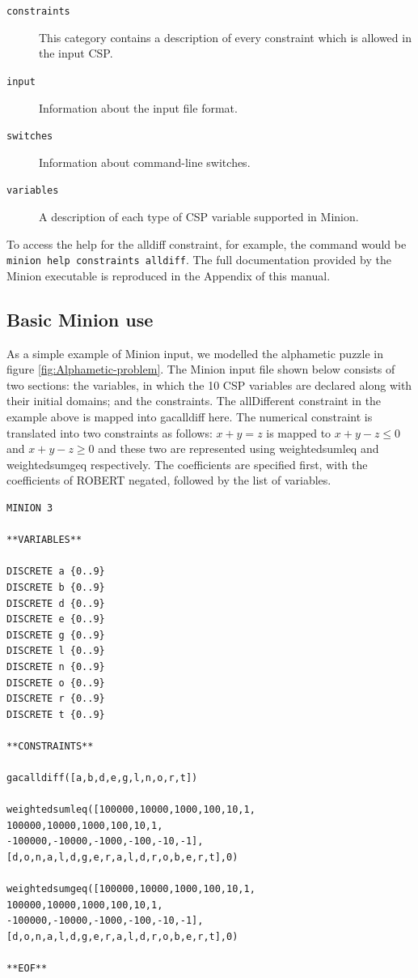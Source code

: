 \documentclass[oneside]{book}
\begin{document}
\begin{description}
\item [{\texttt{constraints}}] This category contains a description of
every constraint which is allowed in the input CSP.
\item [{\texttt{input}}] Information about the input file format.
\item [{\texttt{switches}}] Information about command-line switches.
\item [{\texttt{variables}}] A description of each type of CSP variable
supported in Minion.
\end{description}
To access the help for the alldiff constraint, for example, the command
would be \texttt{minion help constraints alldiff}. The full documentation
provided by the Minion executable is reproduced in the Appendix of 
this manual.


\subsection{Basic Minion use}

As a simple example of Minion input, we modelled the alphametic puzzle
in figure \ref{fig:Alphametic-problem}. The Minion input file shown
below consists of two sections: the variables, in which the 10 CSP
variables are declared along with their initial domains; and the constraints.
The allDifferent constraint in the example above is mapped into gacalldiff
here. The numerical constraint is translated into two constraints
as follows: $x+y=z$ is mapped to $x+y-z\le0$ and $x+y-z\ge0$ and
these two are represented using weightedsumleq and weightedsumgeq
respectively. The coefficients are specified first, with the coefficients
of ROBERT negated, followed by the list of variables.

\begin{verbatim}
MINION 3

**VARIABLES**

DISCRETE a {0..9}
DISCRETE b {0..9}
DISCRETE d {0..9}
DISCRETE e {0..9}
DISCRETE g {0..9}
DISCRETE l {0..9}
DISCRETE n {0..9}
DISCRETE o {0..9}
DISCRETE r {0..9}
DISCRETE t {0..9}

**CONSTRAINTS**

gacalldiff([a,b,d,e,g,l,n,o,r,t])

weightedsumleq([100000,10000,1000,100,10,1,
100000,10000,1000,100,10,1,
-100000,-10000,-1000,-100,-10,-1],
[d,o,n,a,l,d,g,e,r,a,l,d,r,o,b,e,r,t],0)

weightedsumgeq([100000,10000,1000,100,10,1,
100000,10000,1000,100,10,1,
-100000,-10000,-1000,-100,-10,-1],
[d,o,n,a,l,d,g,e,r,a,l,d,r,o,b,e,r,t],0)

**EOF**
\end{verbatim}
\end{document}
